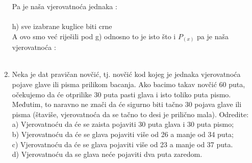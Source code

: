 \documentclass[12pt]{article}
\begin{document}
\begin{enumerate}
\begin{center}
{        Pa je naša vjerovatnoća jednaka : \\ \vspace{0.15cm}
          \\ \vspace{0.25cm}
         h) sve izabrane kuglice biti crne\\
         A ovo smo već riješili pod g) odnosno to je isto što i $P_{(x)}$ pa je naša vjerovatnoća : \\ \vspace{0.25cm}
          \\ \vspace{0.25cm}
		}
	    \end{center}
	    \newpage
		\item Neka je dat pravičan novčić, tj. novčić kod kojeg je jednaka vjerovatnoća pojave glave ili pisma prilikom bacanja. Ako bacimo takav novčić 60 puta, očekujemo da će otprilike 30 puta pasti glava i isto toliko puta pismo. Međutim, to naravno ne znači da će sigurno biti tačno 30 pojava glave ili pisma (štaviše, vjerovatnoća da se tačno to desi je prilično mala). Odredite:\\
		a) Vjerovatnoću da će se zaista pojaviti 30 puta glava i 30 puta pismo; \\
        b) Vjerovatnoću da će se glava pojaviti više od 26 a manje od 34 puta;\\
        c) Vjerovatnoću da će se glava pojaviti više od 23 a manje od 37 puta.\\
        d) Vjerovatnoću da se glava neće pojaviti dva puta zaredom.
		

\end{enumerate}
\end{document}
